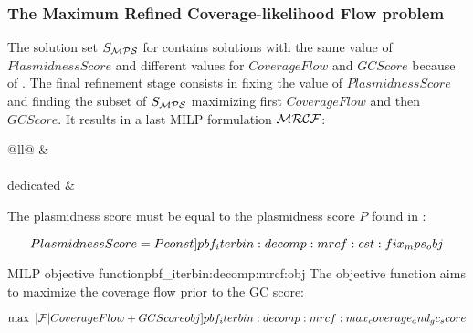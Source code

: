 \subsubsection{The Maximum Refined Coverage-likelihood Flow problem \MRCF{}}\label{sec:pbf_iterbin:decomp:mrcf}

The solution set \(S_{\mathcal{MPS}}{}\) for \MPS{} contains solutions with the same value of \(PlasmidnessScore\) and different values for \(CoverageFlow\) and \(GCScore\) because of .
The final refinement stage consists in fixing the value of \(PlasmidnessScore\) and finding the subset of \(S_{\mathcal{MPS}}{}\) maximizing first \(CoverageFlow\) and then \(GCScore\).
It results in a last MILP formulation \(\mathcal{MRCF}{}\):

\begin{table}[h!]
  \centering
  \label{tab:decomp:mrcf:cst}
  \begin{tabular}{@{}ll@{}}
    \toprule
     &  \\
    \midrule
     \\
    \addlinespace
    \MRCF{} dedicated &  \\
    \bottomrule
  \end{tabular}
\end{table}

The plasmidness score must be equal to the plasmidness score \(P\) found in \MPS{}:
\begin{Constraint}
  \begin{equation}
    PlasmidnessScore = P
    \cstlabel{pbf_iterbin:decomp:mrcf:cst:fix_mps_obj} %
  \end{equation}
\end{Constraint}

\begin{definition}{\MRCF{} MILP objective function}{pbf_iterbin:decomp:mrcf:obj}
  The objective function aims to maximize the coverage flow prior to the GC score:
  \begin{Objective}
    \begin{equation}
      \max ~ |\Fragments{}| CoverageFlow + GCScore
      \objlabel{pbf_iterbin:decomp:mrcf:max_coverage_and_gc_score} %
    \end{equation}
  \end{Objective}
\end{definition}
